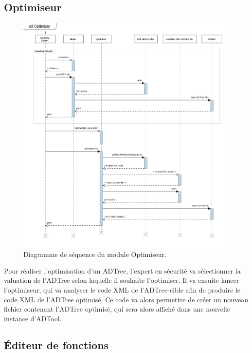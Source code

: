 	\subsection{Optimiseur}

	    \begin{figure}[H]
	        \centering
	        \includegraphics[height=1\textwidth]{figure/Optim.png}
	        \caption{Diagramme de séquence du module Optimiseur.}
	        \label{fig:optim}
	    \end{figure}

Pour réaliser l'optimisation d'un ADTree, l'expert en sécurité va sélectionner la valuation de l'ADTree selon laquelle il souhaite l'optimiser. Il va ensuite lancer l'optimiseur, qui va analyser le code XML de l'ADTree-cible afin de produire le code XML de l'ADTree optimisé. Ce code va alors permettre de créer un nouveau fichier contenant l'ADTree optimisé, qui sera alors affiché dans une nouvelle instance d'ADTool.

	\subsection{Éditeur de fonctions}


